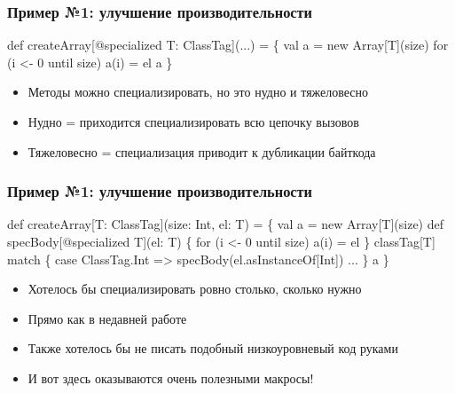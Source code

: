 \documentclass[svgnames,hyperref={bookmarks=false},11pt]{beamer}
\begin{document}
\begin{frame}[fragile]
\frametitle{Пример №1: улучшение производительности}

\begin{semiverbatim}
def createArray[@specialized T: ClassTag](...) = \{
  val a = new Array[T](size)
  for (i <- 0 until size) a(i) = el
  a
\}

\end{semiverbatim}

\begin{itemize}
\item Методы можно специализировать, но это нудно и тяжеловесно
\item Нудно = приходится специализировать всю цепочку вызовов
\item Тяжеловесно = специализация приводит к дубликации байткода
\end{itemize}
\end{frame}

\begin{frame}[fragile]
\frametitle{Пример №1: улучшение производительности}

\begin{semiverbatim}
def createArray[T: ClassTag](size: Int, el: T) = \{
  val a = new Array[T](size)
  \alert{def specBody[@specialized T](el: T) \{}
    \alert{for (i <- 0 until size) a(i) = el}
  \alert{\}}
  \alert{classTag[T] match \{}
    \alert{case ClassTag.Int => specBody(el.asInstanceOf[Int])}
    \alert{...}
  \alert{\}}
  a
\}
\end{semiverbatim}

\begin{itemize}
\item Хотелось бы специализировать ровно столько, сколько нужно
\item Прямо как в недавней работе 
\item Также хотелось бы не писать подобный низкоуровневый код руками
\item И вот здесь оказываются очень полезными макросы!
\end{itemize}
\end{frame}
\end{document}

